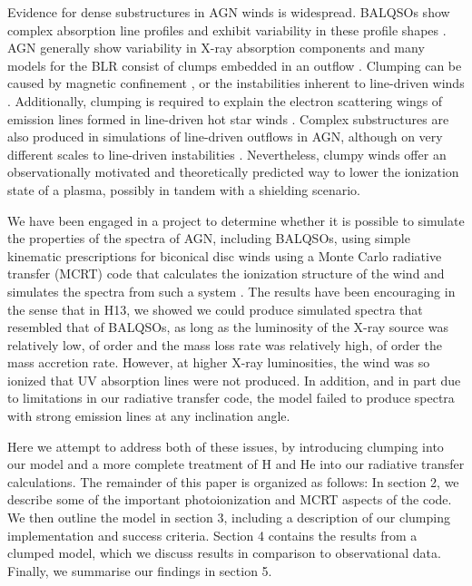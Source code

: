 \documentclass[useAMS,usenatbib]{mn2e_x}
\begin{document}
Evidence for dense substructures in AGN winds is widespread.
BALQSOs show complex absorption line profiles \citep{ganguly2006, simonhamann2010}
and exhibit variability in these profile shapes \citep{capellupo2011,capellupo2012,capellupo2014}.
AGN generally show variability in X-ray absorption components \citep[e.g.][]{risaliti2002}
and many models for the BLR consist of clumps embedded in an outflow 
\citep{krolik1981, emmering1992, dekool1995, cassidyraine1996}.
Clumping can be caused by magnetic confinement \citep{dekool1995},
or the instabilities inherent to line-driven winds 
\citep{lucysolomon1970,macgregor1979,carlberg1980,owockirybicki1984,owockirybicki1985}.
Additionally, clumping is required to explain the electron scattering wings of emission lines formed
in line-driven hot star winds \citep{hillier1991eswingsmodel}. Complex substructures 
are also produced in simulations of line-driven 
outflows in AGN, although on very different scales to line-driven instabilities 
\citep{PSK2000,PK04,progakurosawa2010,proga2014}.  
Nevertheless, clumpy winds offer an observationally motivated and theoretically 
predicted way to lower the ionization state of a plasma, possibly in tandem
with a shielding scenario. 

We have been engaged in a project to determine whether it is possible to simulate the properties of the spectra of AGN, including BALQSOs, using simple kinematic prescriptions for biconical disc winds using a Monte Carlo radiative transfer (MCRT) code that calculates the ionization structure of the wind and simulates the spectra from such a system \citep[][hereafter H13 and H14]{simlong2008,sim2010,higginbottom2013,H14}.  The results have been encouraging in the sense that in H13, we showed we could produce simulated spectra that resembled that of BALQSOs, as long as the luminosity of the X-ray source was relatively low, of order  and the mass loss rate was relatively high, of order the mass accretion rate.  However, at higher X-ray luminosities, the wind was so ionized that UV absorption lines were not produced.  In addition, and in part due to limitations in our radiative transfer code, the model failed to produce spectra with strong emission lines at any inclination angle.  

Here we attempt to address both of these issues, by introducing clumping into our model and a more complete treatment of H and He into our radiative transfer calculations.   The remainder of this paper is organized as follows:
In section 2, we describe some of the important photoionization 
and MCRT aspects of the code. We then outline the model in section 3, including 
a description of our clumping implementation and success criteria. 
Section 4 contains the results from a clumped model, which we discuss results
in comparison to observational data. Finally, we summarise our findings in section 5.
\end{document}
